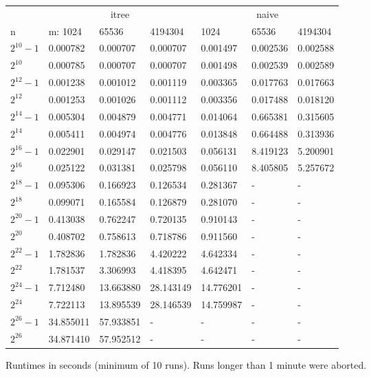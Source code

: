 \documentclass[a4paper,10pt]{article}
\begin{document}
\begin{figure}
\begin{tabular}{lllllll}
\toprule
  & \multicolumn{3}{c}{itree} & \multicolumn{3}{c}{naive} \\
\cmidrule(r){2-4} \cmidrule(r){5-7}
n & m: 1024 & 65536 & 4194304 & 1024 & 65536 & 4194304 \\
\midrule
$2^{10} - 1$ & 0.000782 & 0.000707 & 0.000707 & 0.001497 & 0.002536 & 0.002588 \\
$2^{10}$ & 0.000785 & 0.000707 & 0.000707 & 0.001498 & 0.002539 & 0.002589 \\
$2^{12} - 1$ & 0.001238 & 0.001012 & 0.001119 & 0.003365 & 0.017763 & 0.017663 \\
$2^{12}$ & 0.001253 & 0.001026 & 0.001112 & 0.003356 & 0.017488 & 0.018120 \\
$2^{14} - 1$ & 0.005304 & 0.004879 & 0.004771 & 0.014064 & 0.665381 & 0.315605 \\
$2^{14}$ & 0.005411 & 0.004974 & 0.004776 & 0.013848 & 0.664488 & 0.313936 \\
$2^{16} - 1$ & 0.022901 & 0.029147 & 0.021503 & 0.056131 & 8.419123 & 5.200901 \\
$2^{16}$ & 0.025122 & 0.031381 & 0.025798 & 0.056110 & 8.405805 & 5.257672 \\
$2^{18} - 1$ & 0.095306 & 0.166923 & 0.126534 & 0.281367 & - & - \\
$2^{18}$ & 0.099071 & 0.165584 & 0.126879 & 0.281070 & - & - \\
$2^{20} - 1$ & 0.413038 & 0.762247 & 0.720135 & 0.910143 & - & - \\
$2^{20}$ & 0.408702 & 0.758613 & 0.718786 & 0.911560 & - & - \\
$2^{22} - 1$ & 1.782836 & 1.782836 & 4.420222 & 4.642334 & - & - \\
$2^{22}$ & 1.781537 & 3.306993 & 4.418395 & 4.642471 & - & - \\
$2^{24} - 1$ & 7.712480 & 13.663880 & 28.143149 & 14.776201 & - & - \\
$2^{24}$ & 7.722113 & 13.895539 & 28.146539 & 14.759987 & - & - \\
$2^{26} - 1$ & 34.855011 & 57.933851 & - & - & - & - \\
$2^{26}$ & 34.871410 & 57.952512 & - & - & - & - \\
\bottomrule
\end{tabular}
\caption{Runtimes in seconds (minimum of 10 runs). Runs longer than 1 minute were aborted.}
\end{figure}
\end{document}
